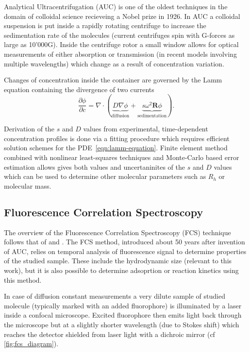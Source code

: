 \documentclass{doctoral}
\newcommand{\pd}{\partial}
\begin{document}
Analytical Ultracentrifugation (AUC) is one of the oldest techniques in the domain of colloidal science recieveing a Nobel prize in 1926.
In AUC a colloidal suspension is put inside a rapidly rotating centrifuge to increase the sedimentation rate of the molecules (current centrifuges spin with G-forces as large as 10'000G).
Inside the centrifuge rotor a small window allows for optical measurements of either absorption or transmission (in recent models involving multiple wavelengths) which change as a result of concentration variation.

Changes of concentration inside the container are governed by the Lamm equation containing the divergence of two currents
\begin{equation}
    \frac{\pd \phi}{\pd c} = \nabla \cdot \left( \underbrace{D \nabla \phi}_\text{diffusion} + \underbrace{s \omega^2 \mathbf{R} \phi}_\text{sedimentation} \right).
    \label{eqn:lamm-equation}
\end{equation}

Derivation of the $s$ and $D$ values from experimental, time-dependent concentration profiles is done via a fitting procedure which requires efficient solution schemes for the PDE~\eqref{eqn:lamm-equation}\cite{Demeler_2016,Cao_2005}.
Finite element method combined with nonlinear least-squares techniques and Monte-Carlo based error estimation allows gives both values and uncertaninites of the $s$ and $D$ values which can be used to determine other molecular parameters such as $R_h$ or molecular mass.

\subsection{Fluorescence Correlation Spectroscopy}
\label{sec:FCS}

The overview of the Fluorescence Correlation Spectroscopy (FCS) technique follows that of \textcite{Tompson_2002} and \textcite{Gregor_2008}.
The FCS method, introduced about 50 years after invention of AUC, relies on temporal analysis of fluorescence signal to determine properties of the studied sample.
These include the hydrodynamic size (relevant to this work), but it is also possible to determine adsoprtion or reaction kinetics using this method.

In case of diffusion constant measurements a very dilute sample of studied molecule (typically marked with an added fluorophore) is illuminated by a laser inside a confocal microscope.
Excited fluorophore then emits light back through the microscope but at a slightly shorter wavelength (due to Stokes shift) which reaches the detector shielded from laser light with a dichroic mirror (cf \ref{fig:fcs_diagram}).
\end{document}
